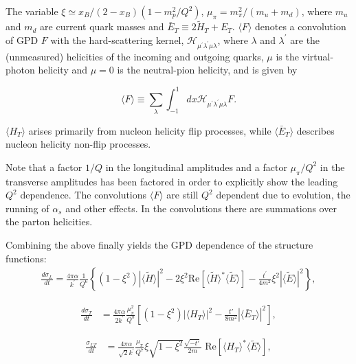 \documentclass[prc,floatfix,twocolumn,superscriptaddress,letter]{revtex4}
\newcommand{\GPDtE}{\langle \tilde{E} \rangle}
\newcommand{\GPDtH}{\langle \tilde{H} \rangle}
\newcommand{\GPDHT}{\langle H_T \rangle}
\newcommand{\GPDETbar}{\langle \bar{E}_T \rangle}
\begin{document}
The variable $\xi\simeq x_B/{(2-x_B)(1-m_p^2/Q^2)}$, 
$\mu_\pi=m^2_\pi/(m_u+m_d)$, where $m_u$ and $m_d$ are current quark masses \cite{G-K-09} and $\bar E_T \equiv 2 \widetilde{H}_T+E_T$.
$\langle F \rangle$ denotes a convolution of GPD $F$ with the hard-scattering kernel, $\mathcal{H}_{\mu^\prime\lambda^\prime\mu\lambda}$, 
where $\lambda$ and $\lambda^\prime$ are the (unmeasured) helicities of the incoming and outgoing quarks, $\mu$ is the virtual-photon helicity and $\mu=0$ is the neutral-pion helicity, and is given by


\begin{equation}
\langle{F}\rangle\equiv\sum_\lambda \int^1_{-1} dx \mathcal{H}_{\mu^\prime\lambda^\prime\mu\lambda}F.
\end{equation}

\noindent
 $\langle H_T\rangle$ arises  primarily from nucleon helicity flip processes, while $\langle\bar{E}_T\rangle$ describes nucleon helicity non-flip processes.



Note that a factor $1/Q$ in the longitudinal amplitudes  and a factor $\mu_\pi/Q^2$ in the transverse amplitudes has been factored  in order to explicitly show the leading $Q^2$ dependence. The convolutions $ \langle F \rangle$  are still $Q^2$ dependent due to evolution, the  running of $\alpha_s$ and other effects. In the convolutions there are summations over the parton helicities. 

Combining the above finally yields  the GPD dependence of the structure functions:
\onecolumngrid
\begin{align}
\label{SL}
\frac{d\sigma_{L} }{dt}= \frac{4\pi\alpha}{k^\prime}\frac{1}{Q^6}\left\{ \left( 1-\xi^2 \right) \left|\GPDtH\right|^2 -2\xi^2\text{Re}\left[ \GPDtH^* \GPDtE \right] - \frac{t^\prime}{4m^2} \xi^2 \left| \GPDtE \right|^2 \right\},
\end{align}

\begin{align}
\label{ST}
\frac{d\sigma_{T}}{dt} &= \frac{4\pi\alpha}{2k^\prime}\frac{\mu_\pi^2}{Q^8} \left[ \left(1-\xi^2\right) \left|\GPDHT\right|^2 - \frac{t'}{8m^2} \left|\GPDETbar\right|^2\right],
\end{align}

\begin{align}
\label{SLT}
\frac{\sigma_{LT}}{dt} &= \frac{4\pi\alpha}{\sqrt{2}k^\prime} \frac{\mu_{\pi}}{Q^7} \xi \sqrt{1-\xi^2} \frac{\sqrt{-t'}}{2m} \text{ Re} \left[ \langle H_T\rangle^* \langle\tilde{E}\rangle \right],
\end{align}
\end{document}
